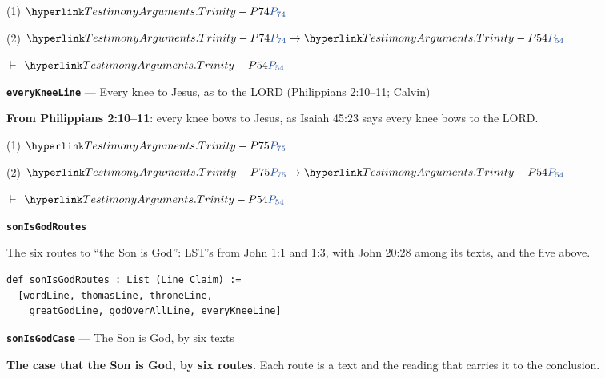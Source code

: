 \documentclass[11pt,paper=\testimonypaper,DIV=13,parskip=false]{scrartcl}
\begin{document}
\begin{derivation}
  \item[(1)] \(\pvar{TestimonyArguments.Trinity}{74}\)
  \item[(2)] \(\pvar{TestimonyArguments.Trinity}{74} \rightarrow \pvar{TestimonyArguments.Trinity}{54}\)
  \item[\(\vdash\)] \(\pvar{TestimonyArguments.Trinity}{54}\)
\end{derivation}
\par\medskip\noindent\textbf{\texttt{every\allowbreak{}Knee\allowbreak{}Line}} --- Every knee to Jesus, as to the LORD (Philippians 2:10–11; Calvin)\par\nobreak\noindent
\textbf{From Philippians 2:10–11}: every knee bows to Jesus, as Isaiah 45:23 says every knee bows to the LORD.

\begin{derivation}
  \item[(1)] \(\pvar{TestimonyArguments.Trinity}{75}\)
  \item[(2)] \(\pvar{TestimonyArguments.Trinity}{75} \rightarrow \pvar{TestimonyArguments.Trinity}{54}\)
  \item[\(\vdash\)] \(\pvar{TestimonyArguments.Trinity}{54}\)
\end{derivation}
\par\medskip\noindent\textbf{\texttt{son\allowbreak{}Is\allowbreak{}God\allowbreak{}Routes}}\par\nobreak\noindent
The six routes to “the Son is God”: LST’s from John 1:1 and 1:3, with John 20:28 among its texts, and the five above.

{\small\begin{verbatim}
def sonIsGodRoutes : List (Line Claim) :=
  [wordLine, thomasLine, throneLine,
    greatGodLine, godOverAllLine, everyKneeLine]
\end{verbatim}}
\par\medskip\noindent\textbf{\texttt{son\allowbreak{}Is\allowbreak{}God\allowbreak{}Case}} --- The Son is God, by six texts\par\nobreak\noindent
\textbf{The case that the Son is God, by six routes.} Each route is a text and the reading that carries it to the conclusion.
\end{document}
